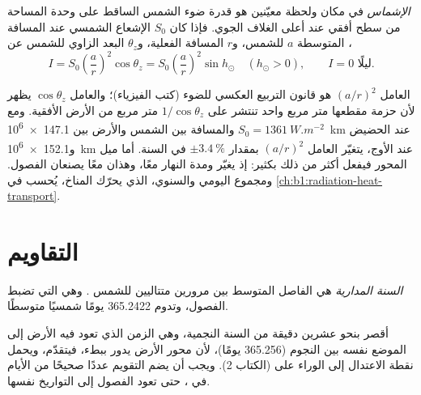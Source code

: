 \begin{definition}[الإشماس]\label{def:b1:spherical-astronomy:insolation}
\emph{الإشماس} في مكان ولحظة معيّنين هو قدرة ضوء الشمس الساقط على وحدة المساحة من سطح أفقي عند أعلى الغلاف الجوي. فإذا كان $S_0$ الإشعاع الشمسي عند المسافة المتوسطة $a$ للشمس، و$r$ المسافة الفعلية، و$\theta_z$ البعد الزاوي للشمس عن ،
\[
  I = S_0\left(\frac{a}{r}\right)^{2}\cos\theta_z = S_0\left(\frac{a}{r}\right)^{2}\sin h_\odot
  \quad (h_\odot > 0), \qquad I = 0 \text{ ليلًا}.
\]
\end{definition}

العامل $(a/r)^2$ هو قانون التربيع العكسي للضوء (كتب الفيزياء)؛ والعامل $\cos\theta_z$ يظهر لأن حزمة مقطعها متر مربع واحد تنتشر على $1/\cos\theta_z$ متر مربع من الأرض الأفقية. ومع $S_0 = \qty{1361}{W.m^{-2}}$ والمسافة بين الشمس والأرض بين \qty{147.1e6}{km} عند الحضيض و\qty{152.1e6}{km} عند الأوج، يتغيّر العامل $(a/r)^2$ بمقدار $\pm\qty{3.4}{\percent}$ في السنة. أما ميل المحور فيفعل أكثر من ذلك بكثير: إذ يغيّر  ومدة النهار معًا، وهذان معًا يصنعان الفصول. ومجموع  اليومي والسنوي، الذي يحرّك المناخ، يُحسب في \cref{ch:b1:radiation-heat-transport}.


\section{التقاويم}

\begin{definition}\label{def:b1:spherical-astronomy:tropical-year}
\emph{السنة المدارية} هي الفاصل المتوسط بين مرورين متتاليين للشمس . وهي التي تضبط الفصول، وتدوم 365.2422 يومًا شمسيًا متوسطًا.
\end{definition}

 أقصر بنحو عشرين دقيقة من السنة النجمية، وهي الزمن الذي تعود فيه الأرض إلى الموضع نفسه بين النجوم (365.256 يومًا)، لأن محور الأرض يدور ببطء، فيتقدّم، ويحمل نقطة الاعتدال إلى الوراء على  (الكتاب 2). ويجب أن يضم التقويم عددًا صحيحًا من الأيام في ، حتى تعود الفصول إلى التواريخ نفسها.

